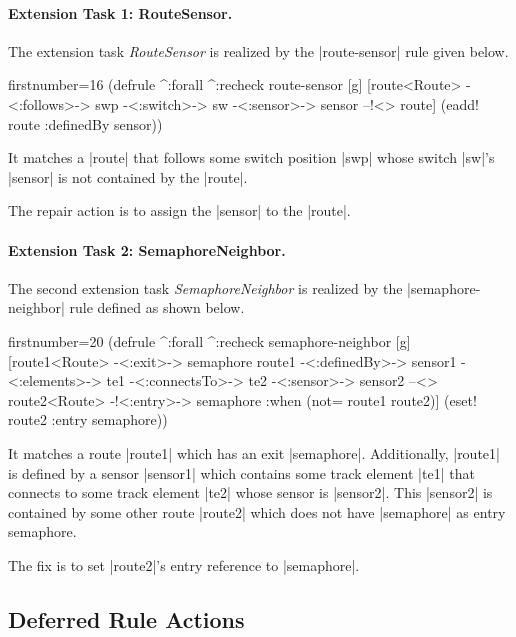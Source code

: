 \documentclass[submission]{eptcs}
\newcommand{\code}{\clojureinline}
\begin{document}
\paragraph{Extension Task 1: RouteSensor.}

The extension task \emph{RouteSensor} is realized by the \code|route-sensor|
rule given below.

\begin{clojurecode*}{firstnumber=16}
(defrule ^:forall ^:recheck route-sensor [g]
  [route<Route> -<:follows>-> swp -<:switch>-> sw
   -<:sensor>-> sensor --!<> route]
  (eadd! route :definedBy sensor))
\end{clojurecode*}

It matches a \code|route| that follows some switch position \code|swp| whose
switch \code|sw|'s \code|sensor| is not contained by the \code|route|.

The repair action is to assign the \code|sensor| to the \code|route|.


\paragraph{Extension Task 2: SemaphoreNeighbor.}

The second extension task \emph{SemaphoreNeighbor} is realized by the
\code|semaphore-neighbor| rule defined as shown below.

\begin{clojurecode*}{firstnumber=20}
(defrule ^:forall ^:recheck semaphore-neighbor [g]
  [route1<Route> -<:exit>-> semaphore
   route1 -<:definedBy>-> sensor1 -<:elements>-> te1
   -<:connectsTo>-> te2 -<:sensor>-> sensor2
   --<> route2<Route> -!<:entry>-> semaphore
   :when (not= route1 route2)]
  (eset! route2 :entry semaphore))
\end{clojurecode*}

It matches a route \code|route1| which has an exit \code|semaphore|.
Additionally, \code|route1| is defined by a sensor \code|sensor1| which
contains some track element \code|te1| that connects to some track element
\code|te2| whose sensor is \code|sensor2|.  This \code|sensor2| is contained by
some other route \code|route2| which does not have \code|semaphore| as entry
semaphore.

The fix is to set \code|route2|'s entry reference to \code|semaphore|.


\subsection{Deferred Rule Actions}
\label{sec:deferred-actions}
\end{document}

